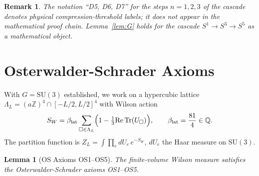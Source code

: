 \documentclass[11pt,a4paper]{article}
\newtheorem{lemma}[theorem]{Lemma}
\newtheorem{remark}[theorem]{Remark}
\begin{document}
\begin{remark}\label{rem:labels}
The notation ``D5, D6, D7'' for the steps $n=1,2,3$ of the cascade
denotes physical compression-threshold labels; it does not appear in the
mathematical proof chain.  Lemma~\ref{lem:G} holds for the cascade
$S^1\to S^3\to S^5$ as a mathematical object.
\end{remark}

\section{Osterwalder-Schrader Axioms}
\label{sec:os}

With $G = \mathrm{SU}(3)$ established, we work on a hypercubic lattice
$\Lambda_L = (a\mathbb{Z})^4 \cap [-L/2,L/2]^4$ with Wilson action
\[
  S_W = \beta_{\rm lat} \sum_{\square \in \Lambda_L}
  \Bigl(1 - \tfrac{1}{3}\mathrm{Re}\,\mathrm{Tr}(U_\square)\Bigr),
  \qquad \beta_{\rm lat} = \frac{81}{4} \in \mathbb{Q}.
\]
The partition function is $Z_L = \int \prod_{e} dU_e\,e^{-S_W}$,
$dU_e$ the Haar measure on $\mathrm{SU}(3)$.

\begin{lemma}[OS Axioms OS1--OS5]\label{lem:os}
The finite-volume Wilson measure satisfies the Osterwalder-Schrader axioms
OS1--OS5.
\end{lemma}
\end{document}
